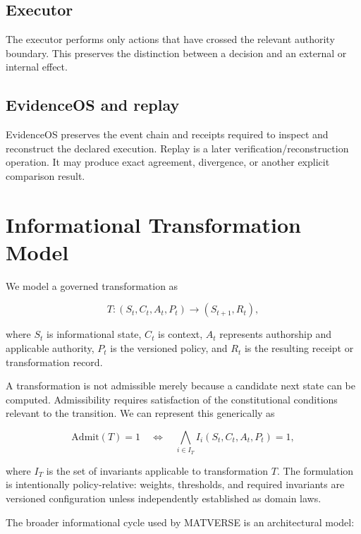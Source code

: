 \documentclass[11pt]{article}
\begin{document}
\subsection{Executor}

The executor performs only actions that have crossed the relevant authority boundary. This preserves the distinction between a decision and an external or internal effect.

\subsection{EvidenceOS and replay}

EvidenceOS preserves the event chain and receipts required to inspect and reconstruct the declared execution. Replay is a later verification/reconstruction operation. It may produce exact agreement, divergence, or another explicit comparison result.

\section{Informational Transformation Model}

We model a governed transformation as

\begin{equation}
T:(S_t,C_t,A_t,P_t)\rightarrow(S_{t+1},R_t),
\end{equation}

where $S_t$ is informational state, $C_t$ is context, $A_t$ represents authorship and applicable authority, $P_t$ is the versioned policy, and $R_t$ is the resulting receipt or transformation record.

A transformation is not admissible merely because a candidate next state can be computed. Admissibility requires satisfaction of the constitutional conditions relevant to the transition. We can represent this generically as

\begin{equation}
\mathrm{Admit}(T)=1 \quad \Leftrightarrow \quad \bigwedge_{i\in I_T} I_i(S_t,C_t,A_t,P_t)=1,
\end{equation}

where $I_T$ is the set of invariants applicable to transformation $T$. The formulation is intentionally policy-relative: weights, thresholds, and required invariants are versioned configuration unless independently established as domain laws.

The broader informational cycle used by MATVERSE is an architectural model:
\end{document}
